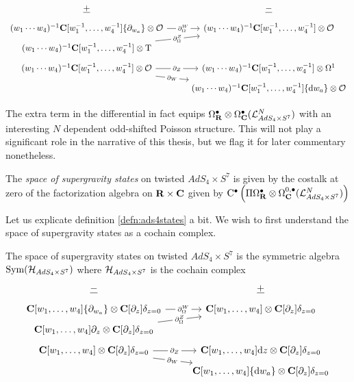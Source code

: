\documentclass[../main.tex]{subfiles}
\begin{document}
 \begin{equation}
 \begin{tikzcd}[row sep = 1 ex]
       \ul{+} & \ul{-} \\ 
(w_1\cdots w_4)^{-1} \C[w_1^{-1},\ldots, w_4^{-1}] \{\partial_{w_a}\} \otimes \mc{O}\ar[r, "\del^W_\Omega" description] & (w_1\cdots w_4)^{-1} \C[w_1^{-1},\ldots, w_4^{-1}]  \otimes \mc O \\
(w_1\cdots w_4)^{-1} \C[w_1^{-1},\ldots, w_4^{-1}]   \otimes \T\ar[ur, "\del^Z_\Omega" description] \\
(w_1\cdots w_4)^{-1} \C[w_1^{-1},\ldots, w_4^{-1}] \otimes \mc{O}\ar[r, "\del_Z" description]\ar[dr, "\del_W" description] & (w_1\cdots w_4)^{-1} \C[w_1^{-1},\ldots, w_4^{-1}] \otimes \Omega^1
\\ & (w_1\cdots w_4)^{-1} \C[w_1^{-1},\ldots, w_4^{-1}] \{\d w_a\}  \otimes \mc O \end{tikzcd}
\end{equation}

\begin{rmk}
The extra term in the differential in fact equips $\Omega^\bullet_{\mathbf{R}}\otimes \Omega^\bullet_{\mathbf{C}} (\mathcal{L}^N_{AdS_4\times S^7} )$ with an interesting $N$ dependent odd-shifted Poisson structure. This will not play a significant role in the narrative of this thesis, but we flag it for later commentary nonetheless.
\end{rmk}

\begin{defn}\label{defn:ads4states}
 The \emph{space of supergravity states} on twisted $AdS_4\times S^7$ is given by the costalk at zero of the factorization algebra on $\mathbf{R}\times \mathbf{C}$ given by ${\mathrm{C}}^\bullet \left (  \Pi \Omega^\bullet_{\mathbf{R}} \otimes \Omega^{0,\bullet}_{\mathbf{C}} (\mathcal{L}^N_{AdS_4\times S^7}) \right )$
\end{defn}


\parsec{}
Let us explicate definition \ref{defn:ads4states} a bit. We wish to first understand the space of supergravity states as a cochain complex. 

\begin{lem}\label{lem:ads4states}
The space of supergravity states on twisted $AdS_4\times S^7$ is the symmetric algebra $\text{Sym} (\mathcal{H}_{AdS_4\times S^7})$ where $\mathcal{H}_{AdS_4\times S^7}$ is the cochain complex
 \begin{equation} 
 \begin{tikzcd}[row sep = 1 ex]
    \ul{-} & \ul{+} \\ 
\C[w_1,\ldots, w_4] \{\partial_{w_a}\} \otimes \C[\del_z]\delta_{z=0}\ar[r, "\del^W_\Omega" description] & \C[w_1,\ldots, w_4]  \otimes \C[\del_z]\delta_{z=0} \\
\C[w_1,\ldots, w_4] \del_z  \otimes \C[\del_z]\delta_{z=0}\ar[ur, "\del^Z_\Omega" description] \\
\C[w_1,\ldots, w_4] \otimes \C[\del_z]\delta_{z=0}\ar[r, "\del_Z" description]\ar[dr, "\del_W" description] & \C[w_1,\ldots, w_4] \d z \otimes \C[\del_z]\delta_{z=0} \\ & \C[w_1,\ldots, w_4] \{\d w_a\}  \otimes \C[\del_z]\delta_{z=0}
\end{tikzcd}
\end{equation}
\end{lem}
\end{document}
